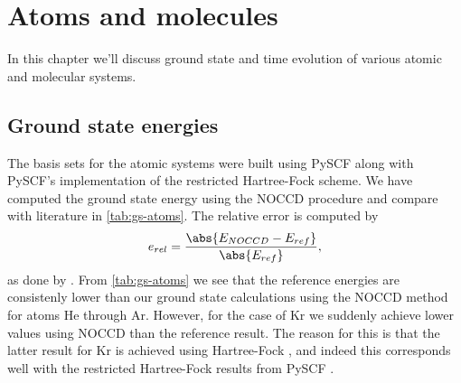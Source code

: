 \chapter{Atoms and molecules}
    In this chapter we'll discuss ground state and time evolution of various
    atomic and molecular systems.

    \section{Ground state energies}
        The basis sets for the atomic systems were built using PySCF
        \cite{pyscf} along with PySCF's implementation of the restricted
        Hartree-Fock scheme.
        We have computed the ground state energy using the NOCCD procedure and
        compare with literature in \autoref{tab:gs-atoms}.
        The relative error is computed by
        \begin{align}
            e_{rel}
            = \frac{\abs{E_{NOCCD} - E_{ref}}}{\abs{E_{ref}}},
        \end{align}
        as done by \citeauthor{hogberget2013quantum}
        \cite{hogberget2013quantum}.
        From \autoref{tab:gs-atoms} we see that the reference energies are
        consistenly lower than our ground state calculations using the NOCCD
        method for atoms He through Ar.
        However, for the case of Kr we suddenly achieve lower values using NOCCD
        than the reference result.
        The reason for this is that the latter result for Kr is achieved using
        Hartree-Fock \cite{partridge-nhf}, and indeed this corresponds well with
        the restricted Hartree-Fock results from PySCF \cite{pyscf}.

